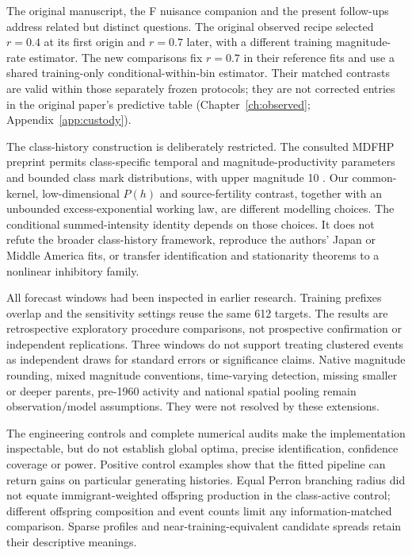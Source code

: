 The original manuscript, the F nuisance companion and the present
follow-ups address related but distinct questions. The original observed
recipe selected \(r=0.4\) at its first origin and \(r=0.7\) later, with a
different training magnitude-rate estimator. The new comparisons fix
\(r=0.7\) in their reference fits and use a shared training-only
conditional-within-bin estimator. Their matched contrasts are valid
within those separately frozen protocols; they are not corrected entries
in the original paper's predictive table (Chapter~\ref{ch:observed}; Appendix~\ref{app:custody}).

The class-history construction is deliberately restricted. The consulted
MDFHP preprint permits class-specific temporal and magnitude-productivity
parameters and bounded class mark distributions, with upper magnitude
10 \citep[Section~2]{DavisBaeumerWangPreprint2024}. Our common-kernel,
low-dimensional \(P(h)\) and source-fertility
contrast, together with an unbounded excess-exponential working law, are
different modelling choices. The conditional summed-intensity identity
depends on those choices. It does not refute the broader class-history
framework, reproduce the authors' Japan or Middle America fits, or
transfer identification and stationarity theorems to a nonlinear
inhibitory family.

All forecast windows had been inspected in earlier research. Training
prefixes overlap and the sensitivity settings reuse the same 612
targets. The results are retrospective exploratory procedure comparisons,
not prospective confirmation or independent replications. Three windows
do not support treating clustered events as independent draws for
standard errors or significance claims. Native magnitude rounding,
mixed magnitude conventions, time-varying detection, missing smaller or
deeper parents, pre-1960 activity and national spatial pooling remain
observation/model assumptions. They were not resolved by these
extensions.

The engineering controls and complete numerical audits make the
implementation inspectable, but do not establish global optima, precise
identification, confidence coverage or power. Positive control examples
show that the fitted pipeline can return gains on particular generating
histories. Equal Perron branching radius did not equate immigrant-weighted
offspring production in the class-active control; different offspring
composition and event counts limit any information-matched comparison.
Sparse profiles and near-training-equivalent candidate spreads retain
their descriptive meanings.

